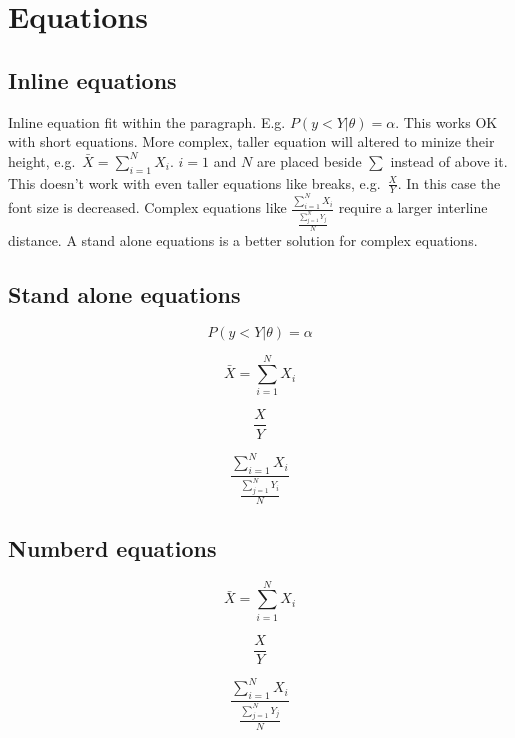 \documentclass[twoside]{extreport}
\begin{document}
\hypertarget{h:formules}{%
\chapter{Equations}\label{h:formules}}

\hypertarget{inline-equations}{%
\section{Inline equations}\label{inline-equations}}

Inline equation fit within the paragraph. E.g.
\(P(y < Y|\theta) = \alpha\). This works OK with short equations. More
complex, taller equation will altered to minize their height,
e.g.~\(\bar{X} = \sum_{i = 1}^NX_i\). \(i = 1\) and \(N\) are placed
beside \(\sum\) instead of above it. This doesn't work with even taller
equations like breaks, e.g.~\(\frac{X}{Y}\). In this case the font size
is decreased. Complex equations like
\(\frac{\sum_{i = 1}^NX_i}{\frac{\sum_{j = 1}^NY_j}{N}}\) require a
larger interline distance. A stand alone equations is a better solution
for complex equations.

\hypertarget{stand-alone-equations}{%
\section{Stand alone equations}\label{stand-alone-equations}}

\[P(y < Y|\theta) = \alpha\]

\[\bar{X} = \sum_{i = 1}^NX_i\]

\[\frac{X}{Y}\]

\[\frac{\sum_{i = 1}^NX_i}{\frac{\sum_{j = 1}^NY_i}{N}}\]

\hypertarget{s:formule-nummer}{%
\section{Numberd equations}\label{s:formule-nummer}}

\begin{equation}
  \bar{X} = \sum_{i = 1}^NX_i
  \label{eq:som}
\end{equation}

\begin{equation}
  \frac{X}{Y}
\end{equation}

\begin{equation}
  \frac{\sum_{i = 1}^NX_i}{\frac{\sum_{j = 1}^NY_j}{N}}
\end{equation}
\end{document}

